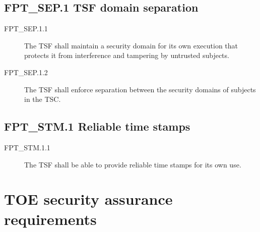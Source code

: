 \documentclass[10pt,a4paper,english]{scrbook}
\begin{document}

\hypertarget{fpt-sep-1-tsf-domain-separation}{}
\subsection{FPT{\_}SEP.1 TSF domain separation}
\begin{description}
\item[FPT{\_}SEP.1.1 ]

The TSF shall maintain a security domain for its own execution that
protects it from interference and tampering by untrusted
subjects.

\item[FPT{\_}SEP.1.2 ]

The TSF shall enforce separation between the
security domains of subjects in the TSC.

\end{description}



\hypertarget{fpt-stm-1-reliable-time-stamps}{}
\subsection{FPT{\_}STM.1 Reliable time stamps}
\begin{description}
\item[FPT{\_}STM.1.1]

The TSF shall be able to provide reliable time stamps for its own use.

\end{description}



\hypertarget{toe-security-assurance-requirements}{}
\section{TOE security assurance requirements}
\end{document}
